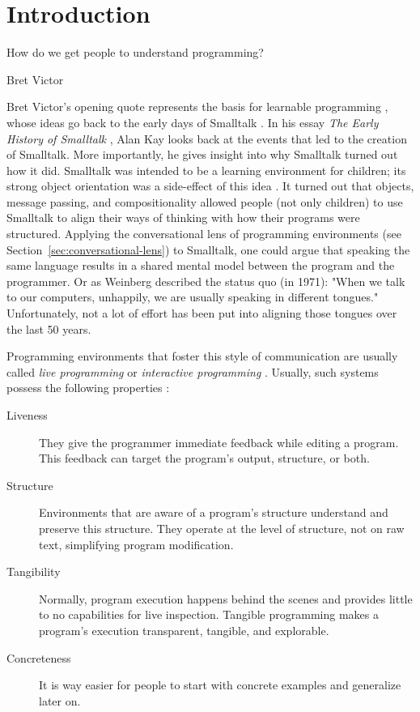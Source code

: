 \chapter{Introduction}
\label{cha:introduction}
\epigraph{How do we get people to understand programming?}{Bret Victor}

\noindent
Bret Victor's opening quote represents the basis for learnable programming \cite{victor_learnable_2012}, whose ideas go back to the early days of Smalltalk \cite{kay_early_1993}.
In his essay \emph{The Early History of Smalltalk} \cite{kay_early_1993}, Alan Kay looks back at the events that led to the creation of Smalltalk.
More importantly, he gives insight into why Smalltalk turned out how it did.
Smalltalk was intended to be a learning environment for children; its strong object orientation was a side-effect of this idea \cite{kay_early_1993}.
It turned out that objects, message passing, and compositionality allowed people (not only children) to use Smalltalk to align their ways of thinking with how their programs were structured.
Applying the conversational lens of programming environments (see Section~\ref{sec:conversational-lens}) to Smalltalk, one could argue that speaking the same language results in a shared mental model between the program and the programmer.
Or as Weinberg described the status quo (in 1971): "When we talk to our computers, unhappily, we are usually speaking in different tongues." \cite{weinberg_psychology_1971}
Unfortunately, not a lot of effort has been put into aligning those tongues over the last 50 years.

Programming environments that foster this style of communication are usually called \emph{live programming} \cite{aguiar_live_2019, church_liveness_2010} or \emph{interactive programming} \cite{czaplicki_interactive_2013, mccabe_towards_2023}.
Usually, such systems possess the following properties \cite{burg_1st_2013}:
\begin{description}
    \item[Liveness] They give the programmer immediate feedback while editing a program. This feedback can target the program's output, structure, or both.
    \item[Structure] Environments that are aware of a program's structure understand and preserve this structure. They operate at the level of structure, not on raw text, simplifying program modification.
    \item[Tangibility] Normally, program execution happens behind the scenes and provides little to no capabilities for live inspection. Tangible programming makes a program's execution transparent, tangible, and explorable.
    \item[Concreteness] It is way easier for people to start with concrete examples and generalize later on.
\end{description}

